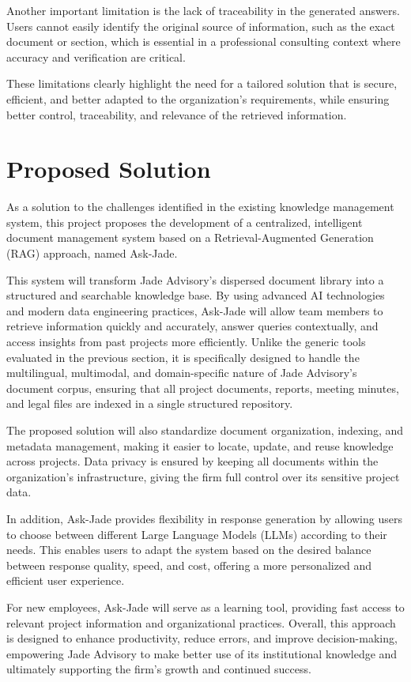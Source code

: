 Another important limitation is the lack of traceability in the generated
answers. Users cannot easily identify the original source of information,
such as the exact document or section, which is essential in a professional
consulting context where accuracy and verification are critical.

These limitations clearly highlight the need for a tailored solution that is
secure, efficient, and better adapted to the organization's requirements,
while ensuring better control, traceability, and relevance of the retrieved
information.

\section{Proposed Solution}
As a solution to the challenges identified in the existing knowledge
management system, this project proposes the development of a centralized,
intelligent document management system based on a Retrieval-Augmented
Generation (RAG) approach, named Ask-Jade.

This system will transform Jade Advisory's dispersed document library into
a structured and searchable knowledge base. By using advanced AI
technologies and modern data engineering practices, Ask-Jade will allow
team members to retrieve information quickly and accurately, answer queries
contextually, and access insights from past projects more efficiently.
Unlike the generic tools evaluated in the previous section, it is
specifically designed to handle the multilingual, multimodal, and
domain-specific nature of Jade Advisory's document corpus, ensuring that
all project documents, reports, meeting minutes, and legal files are
indexed in a single structured repository.

The proposed solution will also standardize document organization, indexing,
and metadata management, making it easier to locate, update, and reuse
knowledge across projects. Data privacy is ensured by keeping all documents
within the organization's infrastructure, giving the firm full control over
its sensitive project data.

In addition, Ask-Jade provides flexibility in response generation by
allowing users to choose between different Large Language Models (LLMs)
according to their needs. This enables users to adapt the system based on
the desired balance between response quality, speed, and cost, offering a
more personalized and efficient user experience.

For new employees, Ask-Jade will serve as a learning tool, providing fast
access to relevant project information and organizational practices.
Overall, this approach is designed to enhance productivity, reduce errors,
and improve decision-making, empowering Jade Advisory to make better use of
its institutional knowledge and ultimately supporting the firm's growth and
continued success.

